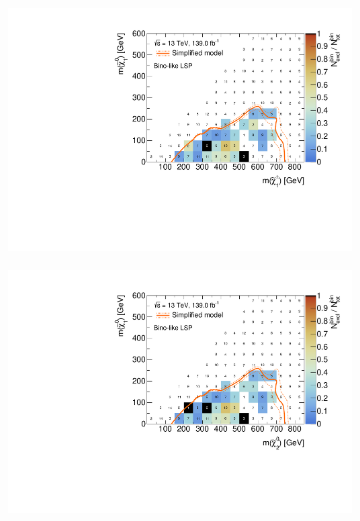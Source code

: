  \begin{figure}
	\centering
	\begin{subfigure}[b]{0.5\linewidth}
		\centering\includegraphics[width=\textwidth]{cut_bino_LSP/mchi1p_mlsp_contour}
		\caption{\label{fig:mchi1p_mlsp_contour_bino_lsp}}
	\end{subfigure}\hfill
	\begin{subfigure}[b]{0.5\linewidth}
		\centering\includegraphics[width=\textwidth]{cut_bino_LSP/mchi20_mlsp_contour}
		\caption{\label{fig:mchi20_mlsp_contour_bino_lsp}}
	\end{subfigure}\hfill
	\begin{subfigure}[b]{0.5\linewidth}

\end{subfigure}
\end{figure}
